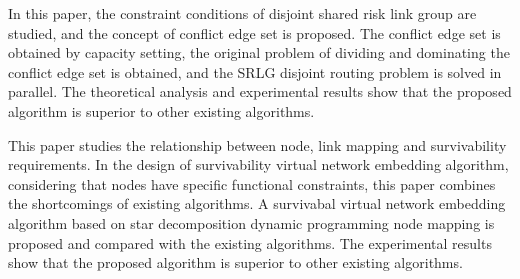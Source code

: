 {In this paper, the constraint conditions of disjoint shared risk link group are studied, and the concept of conflict edge set is proposed. The conflict edge set is obtained by capacity setting, the original problem of dividing and dominating the conflict edge set is obtained, and the SRLG disjoint routing problem is solved in parallel. The theoretical analysis and experimental results show that the proposed algorithm is superior to other existing algorithms.  

This paper studies the relationship between node, link mapping and survivability requirements. In the design of survivability virtual network embedding algorithm, considering that nodes have specific functional constraints, this paper combines the shortcomings of existing algorithms. A survivabal virtual network embedding algorithm based on star decomposition dynamic programming node mapping is proposed and compared with the existing algorithms. The experimental results show that the proposed algorithm is superior to other existing algorithms.

}
\makecover
\clearpage
